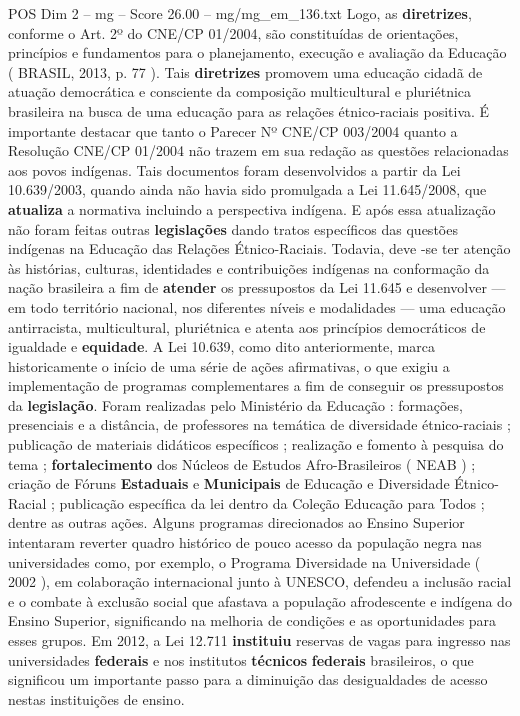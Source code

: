 \begin{textsample}{POS Dim 2 – mg – Score 26.00 – mg/mg\_em\_136.txt}
Logo, as \textbf{diretrizes}, conforme o Art. 2º do CNE/CP 01/2004, são constituídas de orientações, princípios e fundamentos para o planejamento, execução e avaliação da Educação ( BRASIL, 2013, p. 77 ).
Tais \textbf{diretrizes} promovem uma educação cidadã de atuação democrática e consciente da composição multicultural e pluriétnica brasileira na busca de uma educação para as relações étnico-raciais positiva.
É importante destacar que tanto o Parecer Nº CNE/CP 003/2004 quanto a Resolução CNE/CP 01/2004 não trazem em sua redação as questões relacionadas aos povos indígenas.
Tais documentos foram desenvolvidos a partir da Lei 10.639/2003, quando ainda não havia sido promulgada a Lei 11.645/2008, que \textbf{atualiza} a normativa incluindo a perspectiva indígena.
E após essa atualização não foram feitas outras \textbf{legislações} dando tratos específicos das questões indígenas na Educação das Relações Étnico-Raciais.
Todavia, deve -se ter atenção às histórias, culturas, identidades e contribuições indígenas na conformação da nação brasileira a fim de \textbf{atender} os pressupostos da Lei 11.645 e desenvolver — em todo território nacional, nos diferentes níveis e modalidades — uma educação antirracista, multicultural, pluriétnica e atenta aos princípios democráticos de igualdade e \textbf{equidade}.
A Lei 10.639, como dito anteriormente, marca historicamente o início de uma série de ações afirmativas, o que exigiu a implementação de programas complementares a fim de conseguir os pressupostos da \textbf{legislação}.
Foram realizadas pelo Ministério da Educação : formações, presenciais e a distância, de professores na temática de diversidade étnico-raciais ; publicação de materiais didáticos específicos ; realização e fomento à pesquisa do tema ; \textbf{fortalecimento} dos Núcleos de Estudos Afro-Brasileiros ( NEAB ) ; criação de Fóruns \textbf{Estaduais} e \textbf{Municipais} de Educação e Diversidade Étnico-Racial ; publicação específica da lei dentro da Coleção Educação para Todos ; dentre as outras ações.
Alguns programas direcionados ao Ensino Superior intentaram reverter quadro histórico de pouco acesso da população negra nas universidades como, por exemplo, o Programa Diversidade na Universidade ( 2002 ), em colaboração internacional junto à UNESCO, defendeu a inclusão racial e o combate à exclusão social que afastava a população afrodescente e indígena do Ensino Superior, significando na melhoria de condições e as oportunidades para esses grupos.
Em 2012, a Lei 12.711 \textbf{instituiu} reservas de vagas para ingresso nas universidades \textbf{federais} e nos institutos \textbf{técnicos} \textbf{federais} brasileiros, o que significou um importante passo para a diminuição das desigualdades de acesso nestas instituições de ensino.

\end{textsample}
